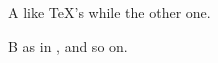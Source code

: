 \documentclass{article}
\begin{document}
A like \TeX's \hx{\def} while the other one.

B as in \hx{\def}, and so on.
\end{document}
